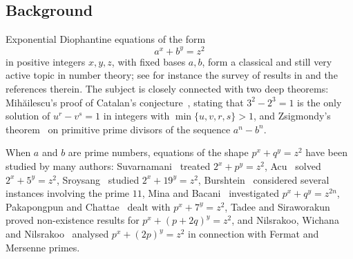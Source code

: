 \documentclass[preprint,12pt]{elsarticle}
\theoremstyle{definition}
\begin{document}
\subsection{Background}

Exponential Diophantine equations of the form
\begin{equation}\label{eq:axby}
a^{x}+b^{y}=z^{2}
\end{equation}
in positive integers $x,y,z$, with fixed bases $a,b$, form a classical and
still very active topic in number theory; see for instance the survey of
results in \cite{Burshtein2017,Sroysang2012,Suvarnamani2011} and the
references therein. The subject is closely connected with two deep theorems:
Mih\u{a}ilescu's proof of Catalan's conjecture~\cite{Mihailescu2004}, stating
that $3^{2}-2^{3}=1$ is the only solution of $u^{r}-v^{s}=1$ in integers
with $\min\{u,v,r,s\}>1$, and Zsigmondy's theorem~\cite{Zsigmondy1892} on
primitive prime divisors of the sequence $a^{n}-b^{n}$.

When $a$ and $b$ are prime numbers, equations of the shape
$p^{x}+q^{y}=z^{2}$ have been studied by many authors:
Suvarnamani~\cite{Suvarnamani2011} treated $2^{x}+p^{y}=z^{2}$,
Acu~\cite{Acu2007} solved $2^{x}+5^{y}=z^{2}$, Sroysang~\cite{Sroysang2012}
studied $2^{x}+19^{y}=z^{2}$, Burshtein~\cite{Burshtein2019,Burshtein2020}
considered several instances involving the prime $11$, Mina and
Bacani~\cite{MinaBacani2019} investigated $p^{x}+q^{y}=z^{2n}$,
Pakapongpun and Chattae~\cite{PakapongpunChattae2022} dealt with
$p^{x}+7^{y}=z^{2}$, Tadee and Siraworakun~\cite{TadeeSiraworakun2023}
proved non-existence results for $p^{x}+(p+2q)^{y}=z^{2}$, and Nilsrakoo,
Wichana and Nilsrakoo~\cite{Nilsrakoo2026} analysed $p^{x}+(2p)^{y}=z^{2}$
in connection with Fermat and Mersenne primes.
\end{document}
